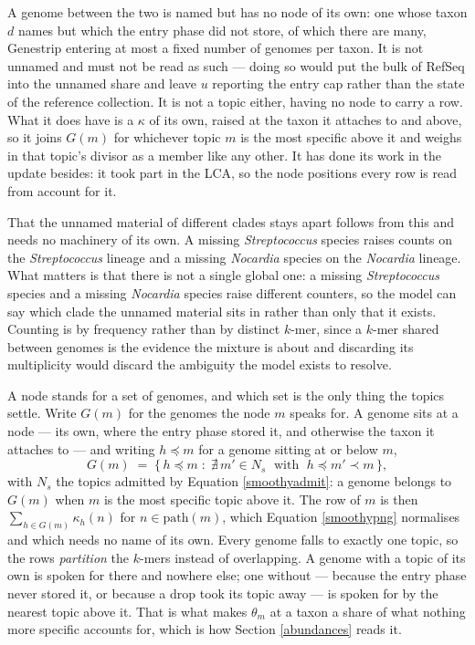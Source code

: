 \documentclass[pdflatex,sn-vancouver-num]{sn-jnl}
\begin{document}
    A genome between the two is named but has no node of its own: one whose taxon $d$ names but
    which the entry phase did not store, of which there are many, Genestrip entering at most a fixed
    number of genomes per taxon. It is not unnamed and must not be read as such --- doing so would
    put the bulk of RefSeq into the unnamed share and leave $u$ reporting the entry cap rather than
    the state of the reference collection. It is not a topic either, having no node to carry a row.
    What it does have is a $\kappa$ of its own, raised at the taxon it attaches to and above, so it
    joins $G(m)$ for whichever topic $m$ is the most specific above it and weighs in that topic's
    divisor as a member like any other. It has done its work in the update besides: it took part in
    the LCA, so the node positions every row is read from account for it.

    That the unnamed material of different clades stays apart follows from this and needs no
    machinery of its own. A missing \emph{Streptococcus} species raises counts on the
    \emph{Streptococcus} lineage and a missing \emph{Nocardia} species on the \emph{Nocardia}
    lineage. What matters is
    that there is not a single global one: a missing \emph{Streptococcus} species and a missing \emph{Nocardia} species
    raise different counters, so the model can say which clade the unnamed material sits in rather
    than only that it exists. Counting is by frequency rather than by distinct $k$-mer, since a $k$-mer shared
    between genomes is the evidence the mixture is about and discarding its multiplicity would
    discard the ambiguity the model exists to resolve.

    A node stands for a set of genomes, and which set is the only thing the topics settle. Write
    $G(m)$ for the genomes the node $m$ speaks for. A genome sits at a node --- its own, where
    the entry phase stored it, and otherwise the taxon it attaches to --- and writing $h \preceq m$
    for a genome sitting at or below $m$,
    \begin{equation}\label{smoothyrows}
        G(m) \;=\; \bigl\{\, h \preceq m \;:\; \nexists\, m' \in N_s \;\text{ with }\;
        h \preceq m' \prec m \,\bigr\} ,
    \end{equation}
    with $N_s$ the topics admitted by Equation \eqref{smoothyadmit}: a genome belongs to $G(m)$
    when $m$ is the most specific topic above it. The row of $m$ is then
    $\sum_{h \in G(m)} \kappa_h(n)$ for $n \in \mathrm{path}(m)$, which
    Equation \eqref{smoothypng} normalises and which needs no name of its own. Every genome falls to
    exactly one topic, so the rows \emph{partition} the $k$-mers instead of overlapping. A genome with
    a topic of its own is spoken for there and nowhere else; one without --- because the entry phase
    never stored it, or because a drop took its topic away --- is spoken for by the nearest topic
    above it. That is what makes $\theta_m$ at a taxon a share of what nothing more specific accounts
    for, which is how Section \ref{abundances} reads it.
\end{document}

